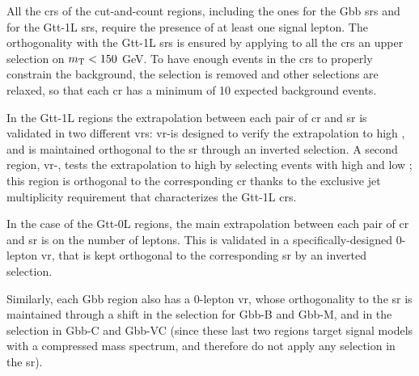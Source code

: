 All the \glspl{cr} of the cut-and-count regions, including the ones for the Gbb \glspl{sr} and for the Gtt-1L \glspl{sr}, 
require the presence of at least one signal lepton. 
The orthogonality with the Gtt-1L \glspl{sr} is ensured by applying to all the \glspl{cr} an upper selection on $m_\mathrm{T} < 150$ GeV.
To have enough events in the \glspl{cr} to properly constrain the \ttbar background, the 
\mtb selection is removed and other selections are relaxed, 
so that each \gls{cr} has a minimum of 10 expected background events. 

In the Gtt-1L regions the extrapolation between each pair of \gls{cr} and \gls{sr} is validated in two different \glspl{vr}:
\gls{vr}-\mt is designed to verify the extrapolation to high \mt, and is maintained orthogonal to the \gls{sr} through an inverted \mjsum 
selection. A second region, \gls{vr}-\mtb, tests the extrapolation to high \mtb by selecting events with high \mtb and low \mt; 
this region is orthogonal to the corresponding \gls{cr} thanks to the exclusive jet multiplicity requirement that characterizes
the Gtt-1L \glspl{cr}.

In the case of the Gtt-0L regions, the main extrapolation between each pair of \gls{cr} and \gls{sr} is on the number of leptons. 
This is validated in a specifically-designed 0-lepton \gls{vr}, 
that is kept orthogonal to the corresponding \gls{sr} by an inverted \mjsum selection.

Similarly, each Gbb region also has a 0-lepton \gls{vr}, whose orthogonality to the \gls{sr} is maintained through 
a shift in the \meff selection for Gbb-B and Gbb-M, and in the \met selection in Gbb-C and Gbb-VC (since these last 
two regions target signal models with a compressed mass spectrum, and therefore do not apply any \meff selection in the \gls{sr}).



